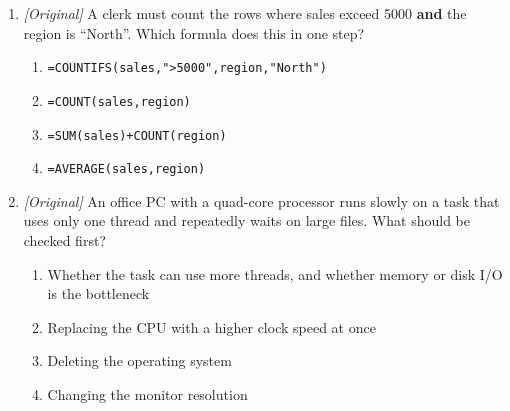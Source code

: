 \documentclass[11pt]{article}
\begin{document}
\begin{enumerate}[label=\textbf{Q\arabic*.}, leftmargin=*]
  \begin{enumerate}[label=\Roman*.]
    \item IPv6 addresses are 128-bit long.
    \item BGP is an inter-domain routing protocol.
    \item HTTP/3 relies on TCP.
  \end{enumerate}
  \begin{enumerate}[label=\Alph*.]
    \item I and II only
    \item II and III only
    \item I, II, and III
    \item I only
  \end{enumerate}
\item \textit{[Original]} A clerk must count the rows where sales exceed 5000
  \textbf{and} the region is ``North''. Which formula does this in one step?
  \begin{enumerate}[label=\Alph*.]
    \item \texttt{=COUNTIFS(sales,"\textgreater5000",region,"North")}
    \item \texttt{=COUNT(sales,region)}
    \item \texttt{=SUM(sales)+COUNT(region)}
    \item \texttt{=AVERAGE(sales,region)}
  \end{enumerate}
\item \textit{[Original]} An office PC with a quad-core processor runs slowly
  on a task that uses only one thread and repeatedly waits on large files.
  What should be checked first?
  \begin{enumerate}[label=\Alph*.]
    \item Whether the task can use more threads, and whether memory or disk
      I/O is the bottleneck
    \item Replacing the CPU with a higher clock speed at once
    \item Deleting the operating system
    \item Changing the monitor resolution
  \end{enumerate}


\end{enumerate}
\end{document}

